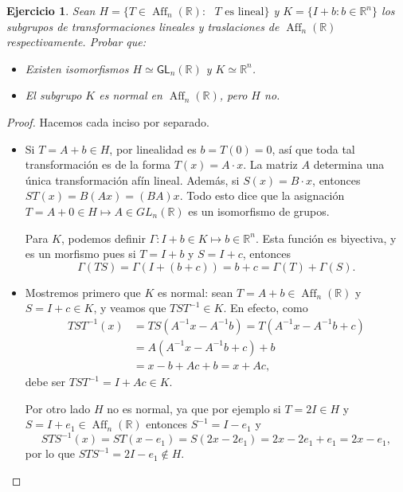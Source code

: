 \documentclass[11pt]{article}
\theoremstyle{colored}
\newtheorem{exercise}{Ejercicio}
\newcommand{\R}{\mathbb{R}}
\DeclareMathOperator{\Aff}{Aff}
\begin{document}
\begin{exercise} Sean $H = \{T \in \Aff_n(\R) : \text{ $T$ es lineal}\}$ y $K = \{I+b : b \in \R^n \}$ los subgrupos de transformaciones lineales y traslaciones de $\Aff_n(\R)$ respectivamente. Probar que:
\begin{itemize}
\item[(i)] Existen isomorfismos $H \simeq \mathsf{GL}_n(\R)$ y $K \simeq \R^n$.
\item[(ii)] El subgrupo $K$ es normal en $\Aff_n(\R)$, pero $H$ no. 
\end{itemize}
\end{exercise}
\begin{proof} Hacemos cada inciso por separado.
\begin{itemize}[listparindent = \parindent]
\item[(i)] Si $T = A+b \in H$, por linealidad es $b = T(0) = 0$, así que toda tal transformación es de la forma $T(x) = A\cdot x$. La matriz $A$ determina una única transformación afín lineal. Además, si $S(x) = B \cdot x$, entonces $ST(x) = B(Ax) = (BA)x$. Todo esto dice que la asignación $T = A + 0 \in H \mapsto A \in GL_n(\R)$ es un isomorfismo de grupos.

Para $K$, podemos definir $\Gamma: I+b \in K \mapsto b \in \R^n$. Esta función es biyectiva, y es un morfismo pues si $T = I+b$ y $S = I+c$, entonces
\[
\Gamma(TS) = \Gamma(I+(b+c)) = b+c = \Gamma(T) + \Gamma(S).
\]
\item[(ii)] Mostremos primero que $K$ es normal: sean $T = A+b\in \Aff_n(\R)$ y $S = I+c \in K$, y veamos que $TST^{-1} \in K$. En efecto, como
\begin{align*}
TST^{-1}(x) &= TS(A^{-1}x-A^{-1}b) = T(A^{-1}x-A^{-1}b +c)
\\&= A(A^{-1}x-A^{-1}b +c) + b\\
& = x-b+Ac+b = x+Ac,
\end{align*}
debe ser $TST^{-1} = I+Ac \in K$.

Por otro lado $H$ no es normal, ya que por ejemplo si $T = 2I \in H$ y $S = I+e_1 \in \Aff_n(\R)$ entonces $S^{-1} = I -e_1$ y 
\[
STS^{-1}(x) = ST(x-e_1) = S(2x-2e_1) = 2x-2e_1 + e_1 = 2x-e_1,
\] 
por lo que $STS^{-1} = 2I-e_1 \not \in H$.
\end{itemize}
\end{proof}
\end{document}
